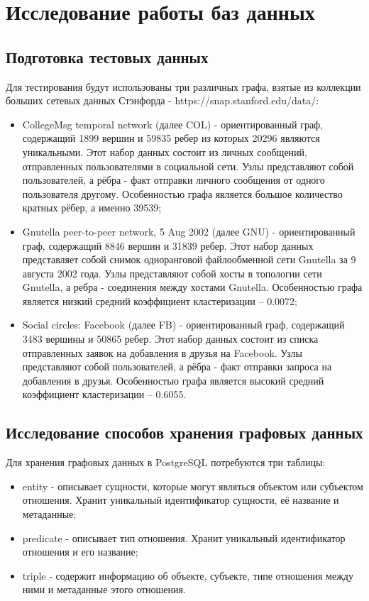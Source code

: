 \chapter{Исследование работы баз данных}


\section{Подготовка тестовых данных}

Для тестирования будут использованы три различных графа, взятые из коллекции больших сетевых данных Стэнфорда - https://snap.stanford.edu/data/:

\begin{itemize}
    \item CollegeMsg temporal network (далее COL) - ориентированный граф, содержащий 1899 вершин и 59835 ребер из которых 20296 являются уникальными. Этот набор данных состоит из личных сообщений, отправленных пользователями в социальной сети. Узлы представляют собой пользователей, а рёбра - факт отправки личного сообщения от одного пользователя другому. Особенностью графа является большое количество кратных рёбер, а именно 39539;
    \item Gnutella peer-to-peer network, 5 Aug 2002 (далее GNU) - ориентированный граф, содержащий 8846 вершин и 31839 ребер. Этот набор данных представляет собой снимок одноранговой файлообменной сети Gnutella за 9 августа 2002 года. Узлы представляют собой хосты в топологии сети Gnutella, а ребра - соединения между хостами Gnutella. Особенностью графа является низкий средний коэффициент кластеризации – 0.0072;
    \item Social circles: Facebook (далее FB) - ориентированный граф, содержащий 3483 вершины и 50865 ребер. Этот набор данных состоит из списка отправленных заявок на добавления в друзья на Facebook. Узлы представляют собой пользователей, а рёбра - факт отправки запроса на добавления в друзья. Особенностью графа является высокий средний коэффициент кластеризации – 0.6055.
\end{itemize}


\section{Исследование способов хранения графовых данных}

Для хранения графовых данных в PostgreSQL потребуются три таблицы:

\begin{itemize}
    \item entity - описывает сущности, которые могут являться объектом или субъектом отношения. Хранит уникальный идентификатор сущности, её название и метаданные;
    \item predicate - описывает тип отношения. Хранит уникальный идентификатор отношения и его название;
    \item triple - содержит информацию об объекте, субъекте, типе отношения между ними и метаданные этого отношения.
\end{itemize}

